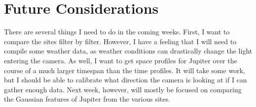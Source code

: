 \documentclass[11pt]{article}
\begin{document}
\section{Future Considerations}
\hspace{0.5cm}

	There are several things I need to do in the coming weeks. First, I want to compare the sites filter by filter. However, I have a feeling that I will need to compile some weather data, as weather conditions can drastically change the light entering the camera. As well, I want to get space profiles for Jupiter over the course of a much larger timespan than the time profiles. It will take some work, but I should be able to calibrate what direction the camera is looking at if I can gather enough data. Next week, however, will mostly be focused on comparing the Gaussian features of Jupiter from the various sites.
\end{document}
